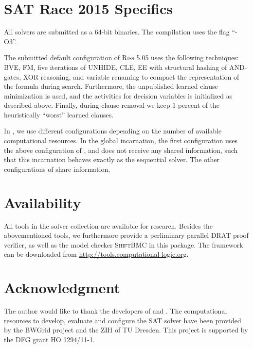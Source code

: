 \documentclass[conference]{IEEEtran}
\begin{document}
\section{SAT Race 2015 Specifics}

All solvers are submitted as a 64-bit binaries. 
The compilation uses the flag ``-O3''. 

The submitted default configuration of \textsc{Riss 5.05} uses the following techniques:
%
BVE, 
FM, 
five iterations of UNHIDE,
CLE,
EE with structural hashing of AND-gates,
XOR reasoning, 
and variable renaming to compact the representation of the formula during search. 
Furthermore, the unpublished learned clause minimization is used, and the activities for decision variables is initialized as described above. 
Finally, during clause removal we keep $1$ percent of the heuristically ``worst'' learned clauses.

In \pcasso, we use different configurations depending on the number of available computational resources. 
In the global \priss incarnation, the first configuration uses the above configuration of \riss, and does not receive any shared information, such that this incarnation behaves exactly as the sequential solver. 
The other configurations of \priss share information,


\section{Availability}

All tools in the solver collection are available for research. 
Besides the abovementioned tools, we furthermore provide a perliminary parallel DRAT proof verifier, as well as the model checker \textsc{ShiftBMC} in this package.
The framework can be downloaded from \url{http://tools.computational-logic.org}.

\section*{Acknowledgment}
The author would like to thank the developers of \glucose and \minisat. 
The computational resources to develop, evaluate and configure the SAT solver have been provided by the BWGrid \cite{bwgrid} project and the ZIH of TU Dresden. 
This project is supported by the DFG grant HO 1294/11-1. 



% 


\end{document}

